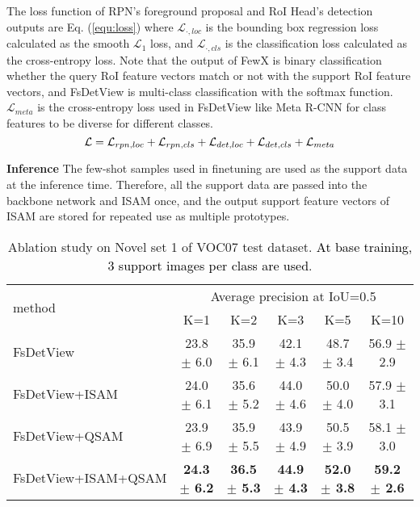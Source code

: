 \documentclass[10pt,twocolumn,letterpaper]{article}
\newcommand{\nj}[1]{\textcolor{black}{#1}}
\begin{document}
\vspace{+0.15cm}
 \quad The loss function of RPN's foreground proposal and RoI Head's detection outputs are Eq. (\ref{equ:loss}) where $\mathcal{L}_{\cdot,loc}$ is the bounding box regression loss calculated as the smooth $\mathcal{L}_{1}$ loss, and $\mathcal{L}_{\cdot,cls}$ is the classification loss calculated as the cross-entropy loss. Note that the output of FewX is binary classification whether the query RoI feature vectors match or not with the support RoI feature vectors, and FsDetView is multi-class classification with the softmax function. $\mathcal{L}_{meta}$ is the cross-entropy loss used in FsDetView like Meta R-CNN \cite{yan2019meta} for class features to be diverse for different classes.
\begin{equation}
    \mathcal{L}= \mathcal{L}_{rpn,loc} + \mathcal{L}_{rpn,cls} + \\ \mathcal{L}_{det,loc} + \mathcal{L}_{det,cls} + \mathcal{L}_{meta}
    \label{equ:loss}
\end{equation}




\vspace{+0.15cm}
\noindent
{\bf Inference} \quad The few-shot samples used in finetuning are used as the support data at the inference time. Therefore, all the support data \nj{are} passed into the backbone network and ISAM once, and the output support feature vectors of ISAM are stored for repeated use as multiple prototypes. 




\begin{table*}
\begin{center}
\begin{tabular}{|l|c|c|c|c|c|}
\hline
\multirow{2}{*}{method} &  \multicolumn{5}{c|}{Average precision at IoU=0.5}      \\ \cline{2-6} 
   &  K=1 & K=2 & K=3 & K=5 & K=10  \\
\hline\hline
FsDetView  & 23.8 $\pm$ 6.0 & 35.9 $\pm$ 6.1 & 42.1 $\pm$ 4.3 & 48.7 $\pm$ 3.4 & 56.9 $\pm$ 2.9 \\
FsDetView+ISAM & 24.0 $\pm$ 6.1 & 35.6 $\pm$ 5.2 & 44.0 $\pm$ 4.6 & 50.0 $\pm$ 4.0 & 57.9 $\pm$ 3.1 \\
FsDetView+QSAM & 23.9 $\pm$ 6.9 & 35.9 $\pm$ 5.5 & 43.9 $\pm$ 4.9 & 50.5 $\pm$ 3.9 & 58.1 $\pm$ 3.0 \\
FsDetView+ISAM+QSAM & \textbf{24.3 $\pm$ 6.2} & \textbf{36.5 $\pm$ 5.3} & \textbf{44.9 $\pm$ 4.3} & \textbf{52.0 $\pm$ 3.8} & \textbf{59.2 $\pm$ 2.6} \\ \hline
\end{tabular}
\end{center}
\caption{Ablation study on Novel set 1 of VOC07 test dataset. \nj{At base training, 3 support images per class are used}.} \vspace{+0.2cm}
\label{table:voc_abl_1_component}
\end{table*}
\end{document}

